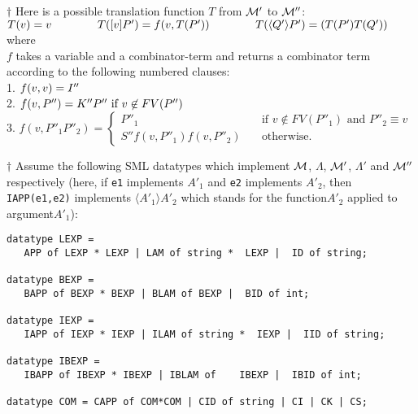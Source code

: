 \documentclass[11pt]{article}
\begin{document}
$\dagger$ Here is a possible translation function $T$ from ${\cal M}'$ to ${\cal M}''$:\\
$T(v) = v      \hspace{0.5in} \: \: T([v]P') = f(v, T(P'))  \: \: \hspace{0.5in}  T(\langle Q' \rangle P') = (T(P')T(Q'))$ where\\
$f$ takes a variable and a combinator-term and returns a combinator term according to the following numbered clauses:\\
1. $f(v,v) = I''   \hspace{0.5in}   \: \:$\\  2. $f(v,P'')=  K''P''  \mbox{  if $v \not \in FV(P'')$}   \: \:  \hspace{0.5in} $\\
3. $f(v,P''_1P''_2)=  \begin{cases}
P''_1 &\quad\mbox{if $v \not \in FV(P''_1)$ and $P''_2 \equiv v$}\\
S''f(v,P''_1)f(v,P''_2) & \quad\mbox{otherwise.} 
\end{cases}$

$\dagger$ Assume the following SML  datatypes which implement ${\cal M}$, $\Lambda$, ${\cal M}'$, $\Lambda'$ and ${\cal M}''$ respectively (here, if \texttt{e1} implements $A'_1$ and \texttt{e2} implements $A'_2$, then 
 \texttt{IAPP(e1,e2)} implements $\langle A'_1\rangle A'_2$ which  stands for the function$A'_2$ applied to argument$A'_1$):
\begin{verbatim}
datatype LEXP =  
   APP of LEXP * LEXP | LAM of string *  LEXP |  ID of string;

datatype BEXP =  
   BAPP of BEXP * BEXP | BLAM of BEXP |  BID of int;

datatype IEXP =  
   IAPP of IEXP * IEXP | ILAM of string *  IEXP |  IID of string;

datatype IBEXP =  
   IBAPP of IBEXP * IBEXP | IBLAM of    IBEXP |  IBID of int;

datatype COM = CAPP of COM*COM | CID of string | CI | CK | CS;
\end{verbatim}
\end{document}
